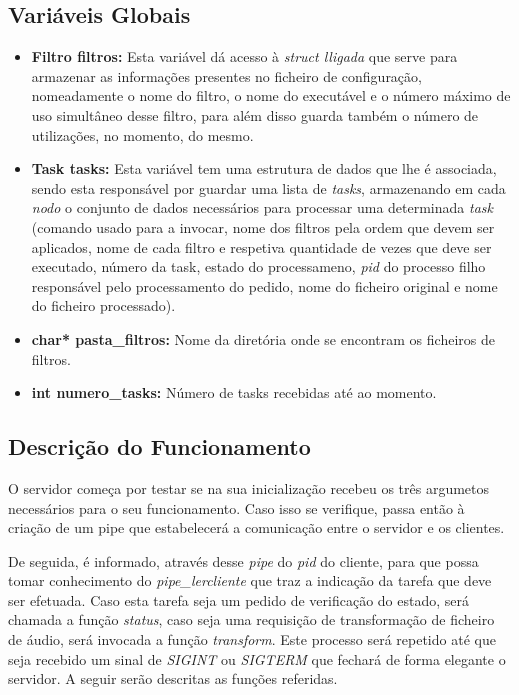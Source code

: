 \documentclass[11pt,a4paper]{report}
\begin{document}
\subsection{Variáveis Globais}

\begin{itemize}
\item \textbf{Filtro filtros: } Esta variável dá acesso à \emph{struct lligada} que serve para armazenar as informações presentes no ficheiro de configuração, nomeadamente  o nome do filtro, o nome do executável e o número máximo de uso simultâneo desse filtro, para além disso guarda também o número de utilizações, no momento, do mesmo.
\item \textbf{Task tasks: } Esta variável tem uma estrutura de dados que lhe é associada, sendo esta responsável por guardar uma lista de \emph{tasks}, armazenando em cada \emph{nodo} o conjunto de dados necessários para processar uma determinada \emph{task} (comando usado para a invocar, nome dos filtros pela ordem que devem ser aplicados, nome de cada filtro e respetiva quantidade de vezes que deve ser executado, número da task, estado do processameno, \emph{pid} do processo filho responsável pelo processamento do pedido, nome do ficheiro original e nome do ficheiro processado).
\item \textbf{char* pasta\_filtros: } Nome da diretória onde se encontram os ficheiros de filtros. 
\item \textbf{int numero\_tasks:} Número de tasks recebidas até ao momento.
\end{itemize}

\subsection{Descrição do Funcionamento}

O servidor começa por testar se na sua inicialização recebeu os três argumetos necessários para o seu funcionamento. Caso isso se verifique, passa então à criação de um pipe que estabelecerá a comunicação entre o servidor e os clientes.

De seguida, é informado, através desse \emph{pipe} do \emph{pid} do cliente, para que possa tomar conhecimento do \emph{pipe\_lercliente} que traz a indicação da tarefa que deve ser efetuada. Caso esta tarefa seja um pedido de verificação do estado, será chamada a função \emph{status}, caso seja uma requisição de transformação de ficheiro de áudio, será invocada a função \emph{transform}. Este processo será repetido até que seja recebido um sinal de \emph{SIGINT} ou \emph{SIGTERM} que fechará de forma elegante o servidor. A seguir serão descritas as funções referidas.
\end{document}
